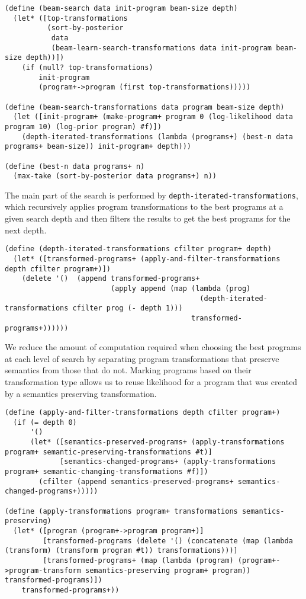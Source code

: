 \documentclass[a4paper,10pt]{article}
\begin{document}
\begin{lstlisting}[frame=trBL]
(define (beam-search data init-program beam-size depth)
  (let* ([top-transformations 
          (sort-by-posterior
           data 
           (beam-learn-search-transformations data init-program beam-size depth))])
    (if (null? top-transformations)
        init-program
        (program+->program (first top-transformations)))))

(define (beam-search-transformations data program beam-size depth)
  (let ([init-program+ (make-program+ program 0 (log-likelihood data program 10) (log-prior program) #f)])
    (depth-iterated-transformations (lambda (programs+) (best-n data programs+ beam-size)) init-program+ depth)))

(define (best-n data programs+ n)
  (max-take (sort-by-posterior data programs+) n))
\end{lstlisting}
The main part of the search is performed by \texttt{depth-iterated-transformations}, which recursively applies program transformations to the best programs at a given search depth and then filters the results to get the best programs for the next depth.
\begin{lstlisting}[frame=trBL]
(define (depth-iterated-transformations cfilter program+ depth)
  (let* ([transformed-programs+ (apply-and-filter-transformations depth cfilter program+)])
    (delete '()  (append transformed-programs+
                         (apply append (map (lambda (prog) 
                                              (depth-iterated-transformations cfilter prog (- depth 1))) 
                                            transformed-programs+))))))
\end{lstlisting}
We reduce the amount of computation required when choosing the best programs at each level of search by separating program transformations that preserve semantics from those that do not.  Marking programs based on their transformation type allows us to reuse likelihood for a program that was created by a semantics preserving transformation.
\begin{lstlisting}[frame=trBL]
(define (apply-and-filter-transformations depth cfilter program+)
  (if (= depth 0)
      '()
      (let* ([semantics-preserved-programs+ (apply-transformations program+ semantic-preserving-transformations #t)]
             [semantics-changed-programs+ (apply-transformations program+ semantic-changing-transformations #f)])
        (cfilter (append semantics-preserved-programs+ semantics-changed-programs+)))))

(define (apply-transformations program+ transformations semantics-preserving)
  (let* ([program (program+->program program+)]
         [transformed-programs (delete '() (concatenate (map (lambda (transform) (transform program #t)) transformations)))]
         [transformed-programs+ (map (lambda (program) (program+->program-transform semantics-preserving program+ program)) transformed-programs)])
    transformed-programs+))
\end{lstlisting}
\end{document}
